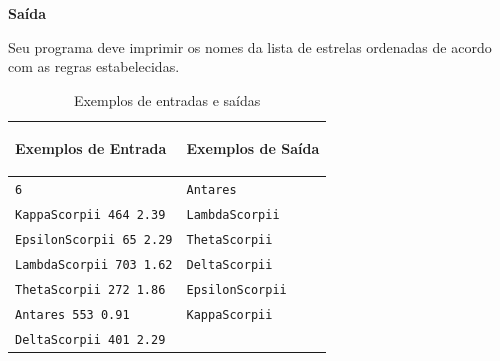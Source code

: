\vspace{0.3cm}
\textbf{Saída}

Seu programa deve imprimir os nomes da lista de estrelas ordenadas de acordo com as regras estabelecidas.

\begin{table}[h]
    \centering
    \begin{tabular}{|p{7cm}|p{7cm}|}
        \hline
        \begin{center}
            \vspace{-0.3cm}
            \textbf{Exemplos de Entrada}
            \vspace{-0.3cm}
        \end{center} 
         &  
        \begin{center}
            \vspace{-0.3cm}
            \textbf{Exemplos de Saída}
            \vspace{-0.3cm}
        \end{center} \\ \hline
         \texttt{6} & \texttt{Antares} \\  
         \texttt{KappaScorpii 464 2.39} & \texttt{LambdaScorpii} \\
         \texttt{EpsilonScorpii 65 2.29} &  \texttt{ThetaScorpii} \\
         \texttt{LambdaScorpii 703 1.62} &  \texttt{DeltaScorpii} \\
         \texttt{ThetaScorpii 272 1.86} &  \texttt{EpsilonScorpii} \\
         \texttt{Antares 553 0.91} &  \texttt{KappaScorpii} \\
         \texttt{DeltaScorpii 401 2.29} &  \\
         \hline
    \end{tabular}
    \caption{Exemplos de entradas e saídas}
    \label{tab:inputB}
\end{table}

\newpage

\begin{center}
\noindent

\end{center}
